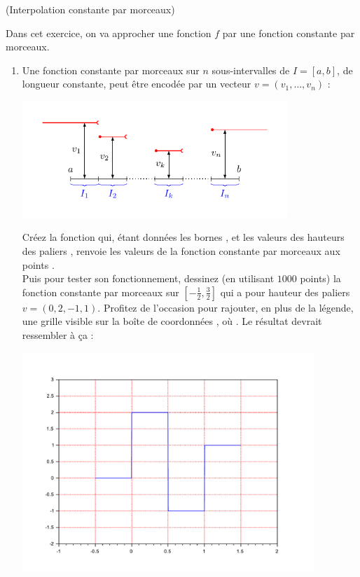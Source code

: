 \documentclass[a4paper,12pt,reqno]{amsart}
\begin{document}
\begin{exo} (Interpolation constante par morceaux)

  Dans cet exercice, on va approcher une fonction $f$ par une fonction constante par morceaux.
  \begin{enumerate}
    \item Une fonction constante par morceaux sur $n$ sous-intervalles de $I=[a,b]$, de longueur constante, peut être encodée par un vecteur $v=(v_{1},\ldots,v_{n})$ :
    \begin{center}
      \includegraphics[width=10cm]{ConstParMorceaux}
    \end{center}
    Créez la fonction  qui, étant données les bornes ,  et les valeurs des hauteurs des paliers , renvoie les valeurs  de la fonction constante par morceaux aux points .\\
    Puis pour tester son fonctionnement, dessinez (en utilisant $1000$ points) la fonction constante par morceaux sur $[-\frac12, \frac32]$ qui a pour hauteur des paliers $v=(0,2,-1,1)$. Profitez de l'occasion pour rajouter, en plus de la légende, une grille  visible sur la boîte de coordonnées , où . Le résultat devrait ressembler à ça :
    \begin{center}
      \includegraphics[width=11cm]{SciLab_test_constante}
    \end{center}


\end{enumerate}
\end{exo}
\end{document}
